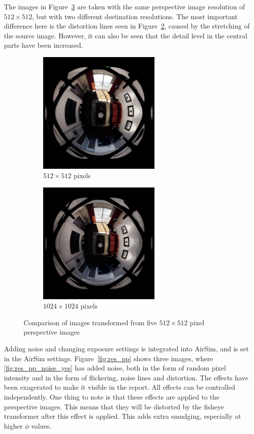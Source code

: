 The images in Figure~\ref{fig:res_comp_equal} are taken with the same perspective image resolution of $512 \times 512$, but with two different destination resolutions. The most important difference here is the distortion lines seen in Figure~\ref{fig:res_comp_equal_512_1024}, caused by the stretching of the source image. However, it can also be seen that the detail level in the central parts have been increased.

\begin{figure}[!htb]
    \centering
    \begin{subfigure}{0.45\textwidth}
        \centering
        \includegraphics[height=6cm]{rapport/fig/Results/512to512.jpeg}
        \caption{$512 \times 512$ pixels}
        \label{fig:res_comp_equal_512_512}
    \end{subfigure}
    \begin{subfigure}{0.45\textwidth}
        \centering
        \includegraphics[height=6cm]{rapport/fig/Results/512to1024.jpeg}
        \caption{$1024 \times 1024$ pixels}
        \label{fig:res_comp_equal_512_1024}
    \end{subfigure}
    \caption{Comparison of images transformed from five $512 \times 512$ pixel perspective images}
    \label{fig:res_comp_equal}
\end{figure}

Adding noise and changing exposure settings is integrated into AirSim, and is set in the AirSim settings. Figure~\ref{fig:res_pp} shows three images, where \ref{fig:res_pp_noise_yes} has added noise, both in the form of random pixel intensity and in the form of flickering, noise lines and distortion. The effects have been exagerated to make it visible in the report. All effects can be controlled independently. One thing to note is that these effects are applied to the perspective images. This means that they will be distorted by the fisheye transformer after this effect is applied. This adds extra smudging, especially at higher $\phi$ values. 

